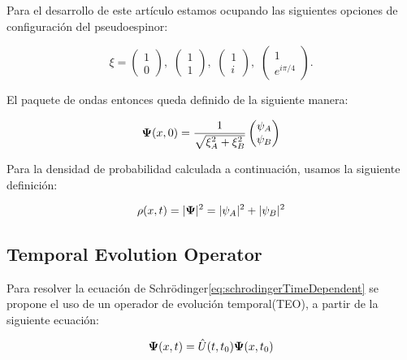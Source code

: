     Para el desarrollo de este artículo estamos ocupando las siguientes opciones de configuración del pseudoespinor:

    \begin{equation}
        \label{eq:pseudospinorConfigurations}
        \xi=\begin{pmatrix} 1\\0
        \end{pmatrix},\,\,\begin{pmatrix} 1\\1
        \end{pmatrix},\,\,\begin{pmatrix} 1\\i
        \end{pmatrix},\,\,\begin{pmatrix} 1\\e^{i\pi/4}
        \end{pmatrix}.
    \end{equation}

    El paquete de ondas entonces queda definido de la siguiente manera:

    \begin{equation}
        \label{eq:FinalGWP}
        \mbox{\boldmath $\Psi$}(x,0)=\frac{1}{\sqrt {\xi_A^2 + \xi_B^2}}\begin{pmatrix}
                                                         \psi_A\\\psi_B
        \end{pmatrix}
    \end{equation}

    Para la densidad de probabilidad calculada a continuación, usamos la siguiente definición:

    \begin{equation}
        \label{eq:probDens}
        \rho(x,t)=|\mbox{\boldmath $\Psi$}|^2 = |\psi_A|^2+|\psi_B|^2
    \end{equation}

    \subsection{Temporal Evolution Operator}\label{subsec:temporal-evolution-operator}
    Para resolver la ecuación de Schrödinger\eqref{eq:schrodingerTimeDependent} se propone el uso de un operador de evolución temporal(TEO), a partir de la siguiente ecuación:

    \begin{equation}
        \label{eq:TEOdifEq}
        \mbox{\boldmath $\Psi$}(x,t)=\hat{U}(t,t_0)\mbox{\boldmath $\Psi$}(x,t_0)
    \end{equation}

